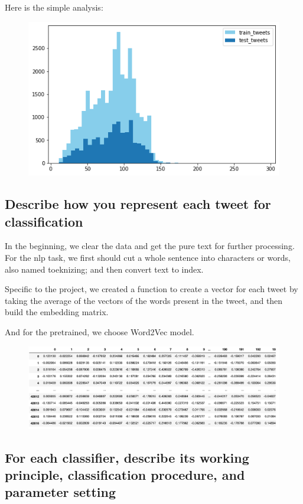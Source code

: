 \documentclass{article}
\begin{document}
Here is the simple analysis:

\begin{figure}[H]
    \includegraphics[width=1\textwidth]{Fig2}
\end{figure}

\subsection{Describe how you represent each tweet for classification}

In the beginning, we clear the data and get the pure text for further processing.
For the nlp task, we first should cut a whole sentence into characters or words, also named toeknizing;
and then convert text to index.

Specific to the project, we created a function to create a vector for each tweet by taking the average of the vectors of the words present in the tweet,
and then build the embedding matrix.

And for the pretrained, we choose Word2Vec model.

\begin{figure}[H]
    \includegraphics[width=1\textwidth]{Fig3}
\end{figure}

\subsection{For each classifier, describe its working principle, classification procedure, and parameter setting}
\end{document}
